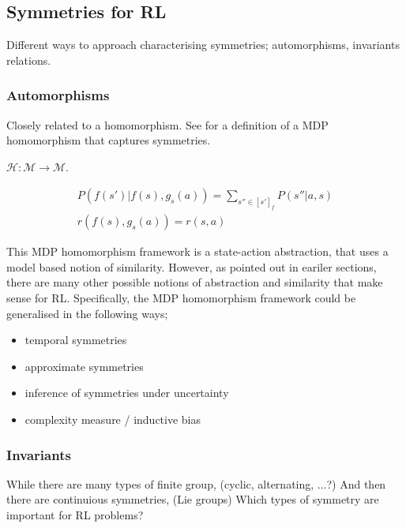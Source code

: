 \subsection{Symmetries for RL}\label{mdp-homomorphism}

Different ways to approach characterising symmetries; automorphisms, invariants relations.

\subsubsection{Automorphisms}

Closely related to a homomorphism. See for a definition of a MDP homomorphism that captures symmetries.

\cite{Ravindran2002}

$\mathcal H: \mathcal M\to \mathcal M$.

\begin{align}
P(f(s')|f(s), g_s(a)) = \sum_{s''\in [s']_f} P(s''| a, s) \\
r(f(s), g_s(a)) = r(s, a)
\end{align}

This MDP homomorphism framework is a state-action abstraction, that uses a model based notion of similarity.
However, as pointed out in eariler sections, there are many other possible
notions of abstraction and similarity that make sense for RL. Specifically, the MDP homomorphism framework
could be generalised in the following ways;

\begin{itemize}
\tightlist
  \item temporal symmetries
  \item approximate symmetries
  \item inference of symmetries under uncertainty
  \item complexity measure / inductive bias
\end{itemize}

\subsubsection{Invariants}

While there are many types of finite group, (cyclic, alternating, ...?) And then there are continuious symmetries, (Lie groups)
Which types of symmetry are important for RL problems?

